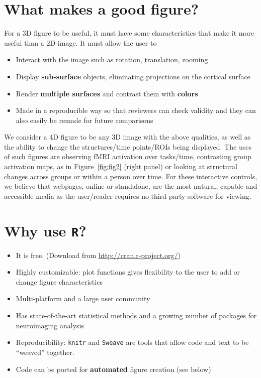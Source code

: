 \documentclass[final]{beamer}\usepackage[]{graphicx}\usepackage[]{color}
\begin{document}
\begin{frame}[fragile]
\begin{multicols}{2}
\section{What makes a good figure?}
For a 3D figure to be useful, it must have some characteristics that make it more useful than a 2D image.  It must allow the user to 
\begin{itemize}
\item Interact with the image such as rotation, translation, zooming
\item Display {\bf sub-surface} objects, eliminating projections on the cortical surface 
\item Render {\bf multiple surfaces} and contrast them with {\bf colors}
\item Made in a reproducible way so that reviewers can check validity and they can also easily be remade for future comparisons
\end{itemize}

We consider a 4D figure to be any 3D image with the above qualities, as well as the ability to change the structures/time points/ROIs being displayed.  The uses of such figures are observing fMRI activation over tasks/time, contrasting group activation maps, as in Figure~\ref{fig:fig2} (right panel) or looking at structural changes across groups or within a person over time.  For these interactive controls, we believe that webpages, online or standalone, are the most natural, capable and accessible media as the user/reader requires no third-party software for viewing.
\vfill
\columnbreak
 
\section{Why use \texttt{R}?}

\begin{itemize}
\item It is free.  (Download from \url{http://cran.r-project.org/})
\item Highly customizable: plot functions gives flexibility to the user to add or change figure characteristics
\item Multi-platform and a large user community
\item Has state-of-the-art statistical methods and a growing number of packages for neuroimaging analysis
\item Reproducibility: \texttt{knitr} and \texttt{Sweave} are tools that allow code and text to be ``weaved'' together.
\item Code can be ported for {\bf automated} figure creation (see below)
\end{itemize}





\end{multicols}
\end{frame}
\end{document}

